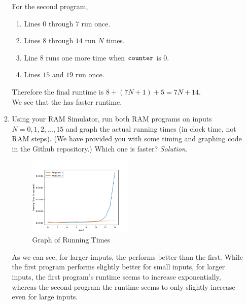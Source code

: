\documentclass[11pt]{article}
\begin{document}
\begin{enumerate}
\begin{enumerate}
    For the second program,
    \begin{enumerate}
        \item Lines $0$ through $7$ run once.
        \item Lines $8$ through $14$ run $N$ times.
        \item Line $8$ runs one more time when $\texttt{counter}$ is $0$.
        \item Lines $15$ and $19$ run once.
    \end{enumerate}
    Therefore the final runtime is $8+(7N+1)+5 = \boxed{7N+14}$. \\
    We see that the  has faster runtime.
    \item Using your RAM Simulator, run both RAM programs on inputs $N=0,1,2,\ldots,15$ and graph the actual running times (in clock time, not RAM steps).  (We have provided you with some timing and graphing code in the Github repository.) Which one is faster?  \label{itm:realtime}  
    \textit{Solution.}
    \begin{figure}[H]
        \centering
        \includegraphics[width=0.5\textwidth]{Figure_1.png}
        \caption{Graph of Running Times}
        \label{fig:example}
    \end{figure}
    As we can see, for larger imputs, the  performs better than the first. While the first program performs slightly better for small inputs, for larger inputs, the first program's runtime seems to increase exponentially, whereas the second program the runtime seems to only slightly increase even for large inputs.
   

\end{enumerate}
\end{enumerate}
\end{document}
